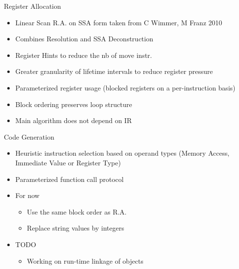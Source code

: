 \begin{frame}{Register Allocation}
    \begin{itemize}
        \item Linear Scan R.A. on SSA form taken from C Wimmer, M Franz 2010
        \item Combines Resolution and SSA Deconstruction
        \item Register Hints to reduce the nb of move instr.
        \item Greater granularity of lifetime intervals to reduce register pressure
        \item Parameterized register usage (blocked registers on a per-instruction basis)
        \item Block ordering preserves loop structure
        \item Main algorithm does not depend on IR
    \end{itemize}
\end{frame}

\begin{frame}{Code Generation}
    \begin{itemize}
        \item Heuristic instruction selection based on operand types (Memory Access, Immediate Value or Register Type)
        \item Parameterized function call protocol
        \item For now 
        \begin{itemize}
            \item Use the same block order as R.A.
            \item Replace string values by integers
        \end{itemize}
        \item TODO
        \begin{itemize}
            \item Working on run-time linkage of objects
        \end{itemize}
    \end{itemize}
\end{frame}

